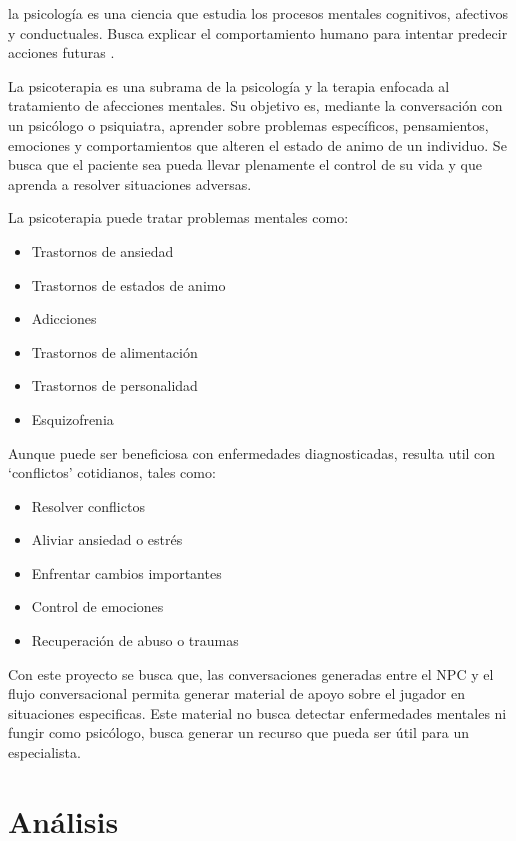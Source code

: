 \documentclass[12pt,twoside]{article}
\begin{document}
	la psicología es una ciencia que estudia los procesos mentales cognitivos, afectivos y conductuales. Busca explicar el comportamiento humano para intentar predecir acciones futuras \cite{info: terapia2}.
	
	La psicoterapia es una subrama de la psicología y la terapia enfocada al tratamiento de afecciones mentales. Su objetivo es, mediante la conversación con un psicólogo o psiquiatra, aprender sobre problemas específicos, pensamientos, emociones y comportamientos que alteren el estado de animo de un individuo. Se busca que el paciente sea pueda llevar plenamente el control de su vida y que aprenda a resolver situaciones adversas.
	
	La psicoterapia puede tratar problemas mentales como:
	\begin{itemize}[noitemsep]
		\item Trastornos de ansiedad
		\item Trastornos de estados de animo
		\item Adicciones
		\item Trastornos de alimentación
		\item Trastornos de personalidad
		\item Esquizofrenia
	\end{itemize}
	
	Aunque puede ser beneficiosa con enfermedades diagnosticadas, resulta util con `conflictos' cotidianos, tales como:
	\begin{itemize}[noitemsep]
		\item Resolver conflictos
		\item Aliviar ansiedad o estrés
		\item Enfrentar cambios importantes
		\item Control de emociones
		\item Recuperación de abuso o traumas \cite{info: terapia3}
	\end{itemize}
	
	Con este proyecto se busca que, las conversaciones generadas entre el NPC y el flujo conversacional permita generar material de apoyo sobre el jugador en situaciones especificas. Este material no busca detectar enfermedades mentales ni fungir como psicólogo, busca generar un recurso que pueda ser útil para un especialista.
	
	\clearpage
	\section{Análisis}
	
\end{document}
